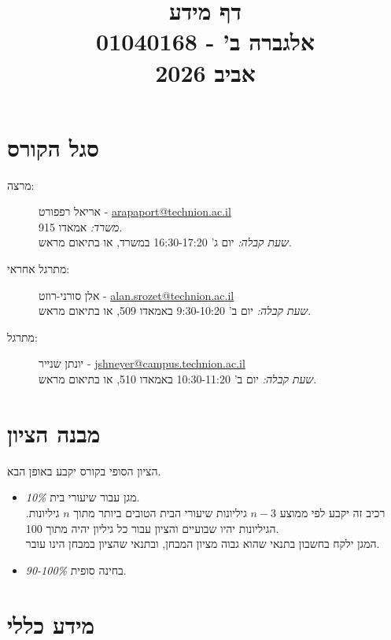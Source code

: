 \documentclass{article}
\title{דף מידע \\ אלגברה ב' - 01040168 \\ אביב 2026}
\date{}
\begin{document}
\maketitle

\section*{סגל הקורס}

\begin{description}
\item[מרצה:]
אריאל רפפורט
-
\textenglish{\href{mailto:arapaport@technion.ac.il}{arapaport@technion.ac.il}}
\\
\emph{משרד:}
אמאדו 915.
\\
\emph{שעת קבלה:}
יום ג' 16:30-17:20 במשרד, או בתיאום מראש.

\item[מתרגל אחראי:] 
אלן סורני-רוזט
-
\textenglish{\href{mailto:alan.srozet@technion.ac.il}{alan.srozet@technion.ac.il}}
\\
\emph{שעת קבלה:}
יום ב' 9:30-10:20 באמאדו 509, או בתיאום מראש.

\item[מתרגל:] 
יונתן שנייר
-
\textenglish{\href{mailto:jshneyer@campus.technion.ac.il}{jshneyer@campus.technion.ac.il}}
\\
\emph{שעת קבלה:}
יום ב' 10:30-11:20 באמאדו 510, או בתיאום מראש.

\end{description}

\section*{מבנה הציון}

הציון הסופי בקורס יקבע באופן הבא.

\begin{itemize}
\item[-] \emph{10\%}
מגן עבור שיעורי בית.
\\
רכיב זה יקבע לפי ממוצע $n-3$ גיליונות שיעורי הבית הטובים ביותר מתוך $n$ גיליונות. הגיליונות יהיו שבועיים והציון עבור כל גיליון יהיה מתוך 100.
\\
המגן ילקח בחשבון בתנאי שהוא גבוה מציון המבחן, ובתנאי שהציון במבחן הינו עובר.
\item[-] \emph{90-100\%}
בחינה סופית.
\end{itemize}

\section*{מידע כללי}
\end{document}
